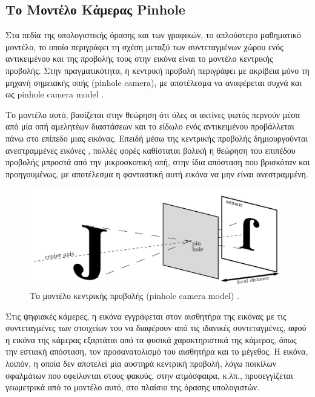 \subsection{Το Μοντέλο Κάμερας Pinhole}



Στα πεδία της υπολογιστικής όρασης και των γραφικών, το απλούστερο μαθηματικό μοντέλο, το οποίο περιγράφει τη σχέση μεταξύ των συντεταγμένων χώρου ενός αντικειμένου και της προβολής τους στην εικόνα είναι το μοντέλο κεντρικής προβολής. Στην πραγματικότητα, η κεντρική προβολή περιγράφει με ακρίβεια μόνο τη μηχανή σημειακής οπής (pinhole camera), με αποτέλεσμα να αναφέρεται συχνά και ως pinhole camera model \cite{hartley2003multiple} .


Το μοντέλο αυτό, βασίζεται στην θεώρηση ότι όλες οι ακτίνες φωτός περνούν μέσα από μία οπή αμελητέων διαστάσεων και το είδωλο ενός αντικειμένου προβάλλεται πάνω στο επίπεδο μιας εικόνας. Επειδή μέσω της κεντρικής προβολής δημιουργούνται ανεστραμμένες εικόνες \cite{fig:pinhole3}, πολλές φορές καθίσταται βολική η θεώρηση του επιπέδου προβολής μπροστά από την μικροσκοπική οπή, στην ίδια απόσταση που βρισκόταν και προηγουμένως, με αποτέλεσμα η φανταστική αυτή εικόνα να μην είναι ανεστραμμένη. 



\begin{figure}[H]
    \centering
    \includegraphics[scale=0.5, angle=0]{Files/Figures/pinhole3.png}
    \caption[Το μοντέλο κεντρικής προβολής (pinhole camera model)]{ Το μοντέλο κεντρικής προβολής (pinhole camera model) \cite{pinhole} .}
    \label{fig:pinhole3}
\end{figure}

Στις ψηφιακές κάμερες, η εικόνα εγγράφεται στον αισθητήρα της εικόνας με τις συντεταγμένες των στοιχείων του να διαφέρουν από τις ιδανικές συντεταγμένες, αφού η εικόνα της κάμερας εξαρτάται από τα φυσικά χαρακτηριστικά της κάμερας, όπως την εστιακή απόσταση, τον προσανατολισμό του αισθητήρα και το μέγεθος. H εικόνα, λοιπόν, η οποία δεν αποτελεί μία αυστηρά κεντρική προβολή, λόγω ποικίλων σφαλμάτων που οφείλονται στους φακούς, στην ατμόσφαιρα, κ.λπ., προσεγγίζεται γεωμετρικά από το μοντέλο αυτό, στο πλαίσιο της όρασης υπολογιστών. 

